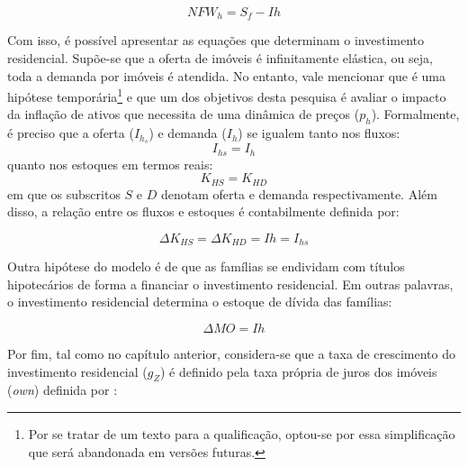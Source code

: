 \begin{equation}
\label{NFWh}
    NFW_h = S_f - Ih
\end{equation}

Com isso, é possível apresentar as equações que determinam o investimento residencial. Supõe-se que a oferta de imóveis é infinitamente elástica, ou seja, toda a demanda por imóveis é atendida. No entanto, vale mencionar que é uma hipótese temporária\footnote{Por se tratar de um texto para a qualificação, optou-se por essa simplificação que será abandonada em versões futuras.} e que um dos objetivos desta pesquisa é avaliar o impacto da inflação de ativos que necessita de uma dinâmica de preços ($p_h$). Formalmente, é preciso que a oferta ($I_{h_s}$) e demanda ($I_h$) se igualem tanto nos fluxos:
\begin{equation}
    I_{hs} = I_h
\end{equation}
quanto nos estoques em termos reais:
\begin{equation}
    K_{HS} = K_{HD}
\end{equation}
em que os subscritos $S$ e $D$ denotam oferta e demanda respectivamente. Além disso, a relação entre os fluxos e estoques é contabilmente definida por:

\begin{equation}
    \Delta K_{HS} = \Delta K_{HD} = Ih = I_{hs}
\end{equation}

Outra hipótese do modelo é de que as famílias se endividam com títulos hipotecários de forma a financiar o investimento residencial. Em outras palavras, o investimento residencial determina o estoque de dívida das famílias:

\begin{equation}
    \label{EqMO}
    \Delta MO = Ih
\end{equation}

Por fim, tal como no capítulo anterior, considera-se que a taxa de crescimento do investimento residencial ($g_Z$) é definido pela taxa própria de juros dos imóveis (\textit{own}) definida por \textcite{teixeira_crescimento_2015}:


